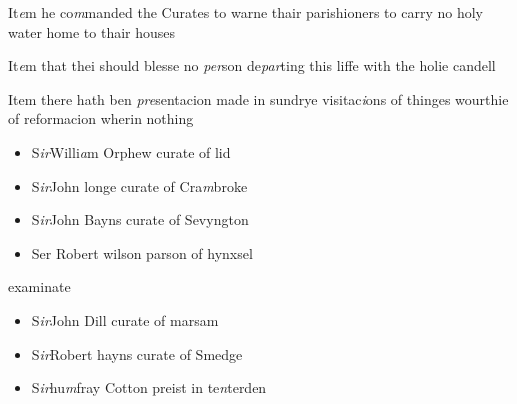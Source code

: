 \documentclass[12pt, a4paper]{book}
\begin{document}
			 
		\ifthenelse{\isodd{\thepage}}
		{\reversemarginpar}
		{\normalmarginpar}
		It\textit{e}m he co\textit{m}manded the Curates to warne thair
 parishioners to carry no holy water home to thair
 houses
 
				\marginpar[\vspace{0.5cm}{\textcolor{Gray}{holy candle}}]{}
			
		\ifthenelse{\isodd{\thepage}}
		{\reversemarginpar}
		{\normalmarginpar}
		It\textit{e}m that thei should blesse no \textit{per}son de\textit{par}ting this liffe
 with the holie candell
 
		\ifthenelse{\isodd{\thepage}}
		{\reversemarginpar}
		{\normalmarginpar}
		Item there hath ben \textit{pre}sentacion made in sundrye visitac\textit{i}ons
 of thinges wourthie of reformacion wherin nothing
               	
 			
			
               		\begin{itemize}
               			\item[]S\textit{ir}Willi\textit{a}m Orphew curate of lid
               			\item[]S\textit{ir}John longe curate of Cra\textit{m}broke
               			\item[]S\textit{ir}John Bayns curate of Sevyngton
               			\item[]Ser Robert wilson parson of hynxsel
               		\end{itemize}
               		examinate
               		\begin{itemize}
               			\item[]S\textit{ir}John Dill curate of marsam
               			\item[]S\textit{ir}Robert hayns curate of Smedge
               			\item[]S\textit{ir}hu\textit{m}fray Cotton preist in te\textit{n}terden
               		\end{itemize}
               		
 
 



\dotfill
					  \subsection*{}  \subsection*{}
\end{document}
